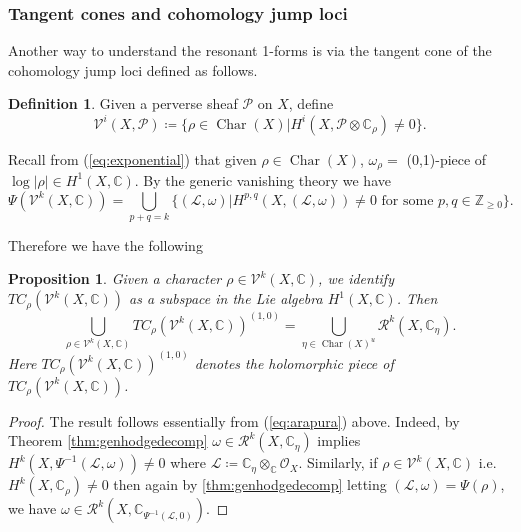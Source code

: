 \documentclass[12pt,reqno]{amsart}
\newtheorem{proposition}[theorem]{Proposition}
\theoremstyle{question}
\theoremstyle{definition}
\newtheorem{definition}[theorem]{Definition}
\theoremstyle{remark}
\theoremstyle{cited}
\theoremstyle{citeddef}
\DeclareMathOperator{\Char}{Char}
\def\Pic{{\rm Pic}}
\newcommand{\sL}{\mathcal{L}}
\newcommand{\sM}{\mathcal{M}}
\newcommand{\sO}{\mathcal{O}}
\newcommand{\sP}{\mathcal{P}}
\newcommand{\sR}{\mathcal{R}}
\newcommand\sV{{\mathcal V}}
\newcommand{\bbC}{\mathbb{C}}
\newcommand{\bbZ}{\mathbb{Z}}
\begin{document}
\subsubsection{Tangent cones and cohomology jump loci}
\label{sub:tc} Another way to understand the resonant 1-forms is via the tangent cone of the cohomology jump loci defined
as follows.
\begin{definition}
Given a perverse sheaf $\sP$ on $X$, define
\[\sV^i(X,\sP) \coloneqq \{\rho\in\Char(X)|
H^i(X,\sP\otimes \bbC_{\rho})\neq 0\}.\]
\end{definition}
Recall from (\ref{eq:exponential}) that given $\rho\in \Char(X)$, $\omega_{\rho} = $ (0,1)-piece of $\log|\rho|\in H^1(X, \bbC)$. 
By the generic vanishing theory \cite[Theorem 3]{Ara92} we have 
\begin{equation}
\Psi(\sV^k(X,\bbC))
=\bigcup_{p+q = k}\{(\sL,\omega)| H^{p,q}(X,(\sL,\omega)) \neq 0
 \text{ for some } p,q\in\bbZ_{\geq 0}\}.
\label{eq:arapura}
\end{equation}

Therefore we have the following
\begin{proposition} 
Given a character $\rho\in \sV^k(X,\bbC)$,
we identify $TC_{\rho}(\sV^k(X,\bbC))$ as a subspace in the
 Lie algebra
$H^1(X,\bbC)$. Then
\[\bigcup_{\rho\in\sV^k(X,\bbC)}TC_{\rho}(\sV^k(X,\bbC))^{(1,0)} = \bigcup_{\eta\in \Char(X)^{u}}\sR^k(X, \bbC_\eta).\]
Here $TC_{\rho}(\sV^k(X,\bbC))^{(1,0)}$ denotes the holomorphic
piece of $TC_{\rho}(\sV^k(X,\bbC))$.
\label{prop:equivalence}
\end{proposition}
\begin{proof}
The result follows essentially from (\ref{eq:arapura})
above. Indeed, by Theorem \ref{thm:genhodgedecomp} $\omega \in \sR^k(X, \bbC_{\eta})$
implies $H^k(X, \Psi^{-1}(\sL, \omega)) \neq 0$
where $\sL\coloneqq \bbC_{\eta}\otimes_{\bbC}\sO_X$.
Similarly, if $\rho\in \sV^k(X, \bbC)$ i.e.\ $H^k(X, \bbC_{\rho})
\neq 0$ then again by \ref{thm:genhodgedecomp} letting
$(\sL, \omega) = \Psi(\rho)$,
we have $\omega\in \sR^k(X, \bbC_{\Psi^{-1}(\sL, 0)})$.

\end{proof}
\end{document}
